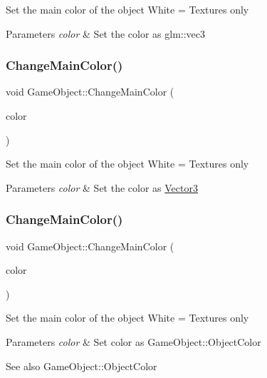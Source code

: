 Set the main color of the object White = Textures only 
\begin{DoxyParams}{Parameters}
{\em color} & Set the color as glm\+::vec3 \\
\hline
\end{DoxyParams}
\mbox{\label{class_game_object_a937d0876d4c7fd514e6069e0b447c976}} 
\subsubsection{\texorpdfstring{ChangeMainColor()}{ChangeMainColor()}\hspace{0.1cm}{\footnotesize\ttfamily [2/3]}}
{\footnotesize\ttfamily void Game\+Object\+::\+Change\+Main\+Color (\begin{DoxyParamCaption}\item[{\mbox{\hyperlink{struct_vector3}{Vector3}}}]{color }\end{DoxyParamCaption})}

Set the main color of the object White = Textures only 
\begin{DoxyParams}{Parameters}
{\em color} & Set the color as \mbox{\hyperlink{struct_vector3}{Vector3}} \\
\hline
\end{DoxyParams}
\mbox{\label{class_game_object_a82a066a59aa5ffad07589419c07383e0}} 
\subsubsection{\texorpdfstring{ChangeMainColor()}{ChangeMainColor()}\hspace{0.1cm}{\footnotesize\ttfamily [3/3]}}
{\footnotesize\ttfamily void Game\+Object\+::\+Change\+Main\+Color (\begin{DoxyParamCaption}\item[{Object\+Color}]{color }\end{DoxyParamCaption})}

Set the main color of the object White = Textures only 
\begin{DoxyParams}{Parameters}
{\em color} & Set color as Game\+Object\+::\+Object\+Color \\
\hline
\end{DoxyParams}
\begin{DoxySeeAlso}{See also}
Game\+Object\+::\+Object\+Color 
\end{DoxySeeAlso}
\mbox{\label{class_game_object_aab74d8c9a731b51be641209670b172f7}} 
